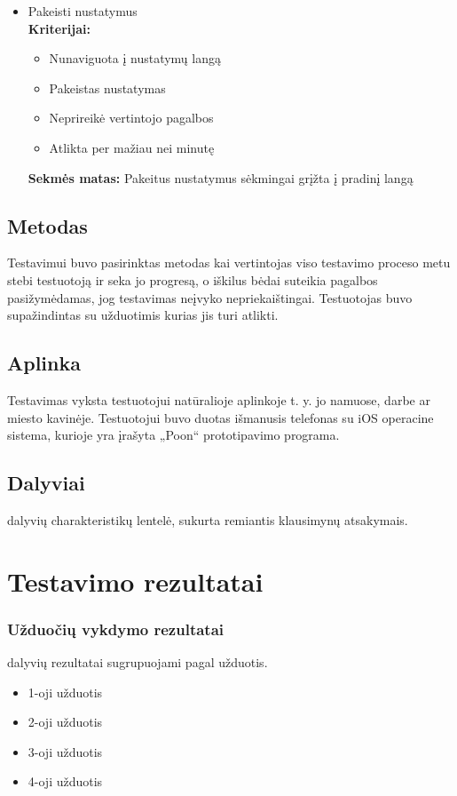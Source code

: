 \documentclass{VUMIFPSkursinis}
\begin{document}
\begin{itemize}
\item Pakeisti nustatymus  \\
	\textbf{Kriterijai:}
	\begin{itemize}
	\item Nunaviguota į nustatymų langą
	\item Pakeistas nustatymas
	\item Neprireikė vertintojo pagalbos
	\item Atlikta per mažiau nei minutę
	\end{itemize}
	\textbf{Sekmės matas:} Pakeitus nustatymus sėkmingai grįžta į pradinį langą \\
\end{itemize}

\subsection{Metodas}
Testavimui buvo pasirinktas metodas kai vertintojas viso testavimo proceso metu stebi testuotoją ir seka jo progresą, o iškilus bėdai suteikia pagalbos pasižymėdamas, jog testavimas neįvyko nepriekaištingai. Testuotojas buvo supažindintas su užduotimis kurias jis turi atlikti.

\subsection{Aplinka}
Testavimas vyksta testuotojui natūralioje aplinkoje t. y. jo namuose, darbe ar miesto kavinėje. Testuotojui buvo duotas išmanusis telefonas su iOS operacine sistema, kurioje yra įrašyta  „Poon“ prototipavimo programa.

\subsection{Dalyviai}

dalyvių charakteristikų lentelė, sukurta remiantis klausimynų atsakymais.

\section{Testavimo rezultatai}
\subsubsection{Užduočių vykdymo rezultatai}
dalyvių rezultatai sugrupuojami pagal užduotis.
	\begin{itemize}
	\item 1-oji užduotis
	\item 2-oji užduotis
	\item 3-oji užduotis
	\item 4-oji užduotis
	\end{itemize}
\end{document}
